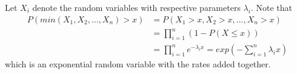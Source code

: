 \documentclass[../../probability-notes.tex]{subfiles}
\begin{document}
    Let $X_{i}$ denote the random variables with respective parameters $\lambda_{i}$.\newline
    Note that
    \begin{align*}
        P(min(X_{1}, X_{2}, \ldots, X_{n}) > x) &= P(X_{1} > x, X_{2} > x, \ldots, X_{n} > x)\\
        &= \prod_{i=1}^{n} (1 - P(X \leq x))\\
        &= \prod_{i=1}^{n} e^{-\lambda_{i}x} = exp(-\sum_{i=1}^{n}\lambda_{i} x)
    \end{align*}
    which is an exponential random variable with the rates added together.
\end{document}
